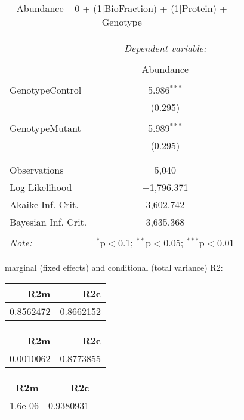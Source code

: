 \documentclass[11pt]{report}
\begin{document}
\begin{table}[!htbp] \centering 
  \caption{Abundance ~ 0 + (1|BioFraction) + (1|Protein) + Genotype} 
  \label{} 
\begin{tabular}{@{\extracolsep{5pt}}lc} 
\\[-1.8ex]\hline 
\hline \\[-1.8ex] 
 & \multicolumn{1}{c}{\textit{Dependent variable:}} \\ 
\cline{2-2} 
\\[-1.8ex] & Abundance \\ 
\hline \\[-1.8ex] 
 GenotypeControl & 5.986$^{***}$ \\ 
  & (0.295) \\ 
  & \\ 
 GenotypeMutant & 5.989$^{***}$ \\ 
  & (0.295) \\ 
  & \\ 
\hline \\[-1.8ex] 
Observations & 5,040 \\ 
Log Likelihood & $-$1,796.371 \\ 
Akaike Inf. Crit. & 3,602.742 \\ 
Bayesian Inf. Crit. & 3,635.368 \\ 
\hline 
\hline \\[-1.8ex] 
\textit{Note:}  & \multicolumn{1}{r}{$^{*}$p$<$0.1; $^{**}$p$<$0.05; $^{***}$p$<$0.01} \\ 
\end{tabular} 
\end{table} 
marginal (fixed effects) and conditional (total variance) R2:

\begin{tabular}{r|r}
\hline
R2m & R2c\\
\hline
0.8562472 & 0.8662152\\
\hline
\end{tabular}

\begin{tabular}{r|r}
\hline
R2m & R2c\\
\hline
0.0010062 & 0.8773855\\
\hline
\end{tabular}

\begin{tabular}{r|r}
\hline
R2m & R2c\\
\hline
1.6e-06 & 0.9380931\\
\hline
\end{tabular}
\end{document}
